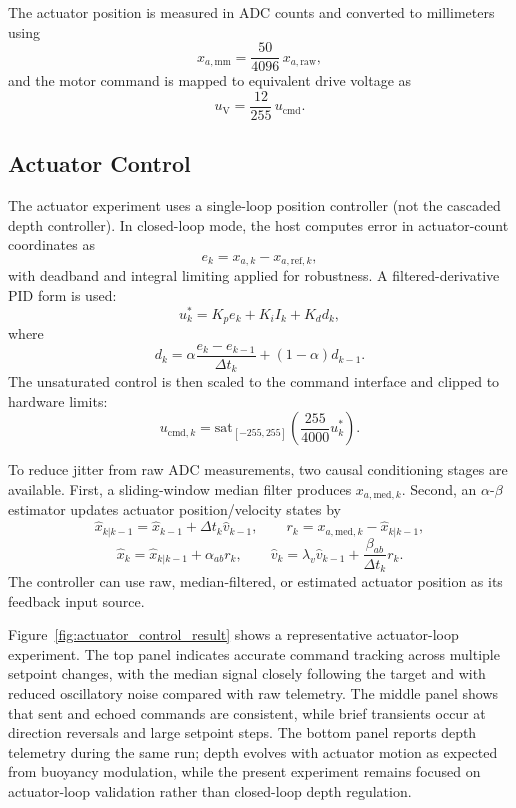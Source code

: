 ﻿\documentclass[subscriptcorrection,upint,varvw,barcolor=Goldenrod3,mathalfa=cal=euler,balance,hyphenate,french,pdf-a]{asmejour}
\begin{document}
The actuator position is measured in ADC counts and converted to millimeters using
\[
    x_{a,\mathrm{mm}}=\frac{50}{4096}\,x_{a,\mathrm{raw}},
\]
and the motor command is mapped to equivalent drive voltage as
\[
    u_{\mathrm{V}}=\frac{12}{255}\,u_{\mathrm{cmd}}.
\]

\subsection{Actuator Control}
The actuator experiment uses a single-loop position controller (not the cascaded depth controller). In closed-loop mode, the host computes error in actuator-count coordinates as
\[
    e_k=x_{a,k}-x_{a,\mathrm{ref},k},
\]
with deadband and integral limiting applied for robustness. A filtered-derivative PID form is used:
\[
    u_k^{\ast}=K_p e_k+K_i I_k+K_d d_k,
\]
where
\[
    d_k=\alpha\frac{e_k-e_{k-1}}{\Delta t_k}+(1-\alpha)d_{k-1}.
\]
The unsaturated control is then scaled to the command interface and clipped to hardware limits:
\begin{equation}
    u_{\mathrm{cmd},k}=\mathrm{sat}_{[-255,255]}\!\left(\frac{255}{4000}u_k^{\ast}\right).
    \label{eqn:act_cmd_saturation}
\end{equation}

To reduce jitter from raw ADC measurements, two causal conditioning stages are available. First, a sliding-window median filter produces $x_{a,\mathrm{med},k}$. Second, an $\alpha$-$\beta$ estimator updates actuator position/velocity states by
\begin{equation}
    \hat{x}_{k|k-1}=\hat{x}_{k-1}+\Delta t_k\hat{v}_{k-1}, \qquad
    r_k=x_{a,\mathrm{med},k}-\hat{x}_{k|k-1},
    \label{eqn:ab_predict_residual}
\end{equation}
\begin{equation}
    \hat{x}_k=\hat{x}_{k|k-1}+\alpha_{ab}r_k, \qquad
    \hat{v}_k=\lambda_v\hat{v}_{k-1}+\frac{\beta_{ab}}{\Delta t_k}r_k.
    \label{eqn:ab_update}
\end{equation}
The controller can use raw, median-filtered, or estimated actuator position as its feedback input source.

Figure~\ref{fig:actuator_control_result} shows a representative actuator-loop experiment. The top panel indicates accurate command tracking across multiple setpoint changes, with the median signal closely following the target and with reduced oscillatory noise compared with raw telemetry. The middle panel shows that sent and echoed commands are consistent, while brief transients occur at direction reversals and large setpoint steps. The bottom panel reports depth telemetry during the same run; depth evolves with actuator motion as expected from buoyancy modulation, while the present experiment remains focused on actuator-loop validation rather than closed-loop depth regulation.
\end{document}

